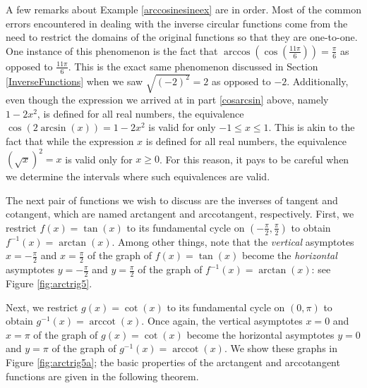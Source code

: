 \medskip

A few remarks about Example \ref{arccosinesineex} are in order.  Most of the common errors encountered in dealing with the inverse circular functions come from the need to restrict the domains of the original functions so that they are one-to-one.  One instance of this phenomenon is the fact that $\arccos\left( \cos\left(\frac{11\pi}{6}\right)\right) = \frac{\pi}{6}$ as opposed to $\frac{11\pi}{6}$. This is the exact same phenomenon discussed in Section \ref{InverseFunctions} when we saw  $\sqrt{(-2)^2} = 2$ as opposed to $-2$.    Additionally, even though the expression we arrived at in part \ref{cosarcsin} above, namely $1 - 2x^2$, is defined for all real numbers, the equivalence  $\cos\left(2 \arcsin(x)\right) = 1-2x^2$ is valid for only $-1 \leq x \leq 1$.  This is akin to the fact that while the expression $x$ is defined for all real numbers, the equivalence $\left( \sqrt{x} \right)^2 = x$ is valid only for $x \geq 0$.  For this reason, it pays to be careful when we determine the intervals where such equivalences are valid.



\bigskip

The next pair of functions we wish to discuss are the inverses of tangent and cotangent, which are named arctangent and arccotangent, respectively.  First, we restrict $f(x) = \tan(x)$ to its fundamental cycle on $\left(-\frac{\pi}{2}, \frac{\pi}{2}\right)$ to obtain $f^{-1}(x) = \arctan(x)$. Among other things, note that the \textit{vertical} asymptotes $x = -\frac{\pi}{2}$ and $x = \frac{\pi}{2}$ of the graph of $f(x) = \tan(x)$ become the \textit{horizontal} asymptotes $y = -\frac{\pi}{2}$ and $y = \frac{\pi}{2}$ of the graph of $f^{-1}(x) = \arctan(x)$: see Figure \ref{fig:arctrig5}.  



Next, we restrict $g(x) = \cot(x)$ to its fundamental cycle on $(0,\pi)$ to obtain $g^{-1}(x) = \operatorname{arccot}(x)$.  Once again, the vertical asymptotes $x=0$ and $x=\pi$ of the graph of $g(x) = \cot(x)$ become the horizontal asymptotes $y = 0$ and $y = \pi$ of the graph of $g^{-1}(x) = \operatorname{arccot}(x)$.  We show these graphs in Figure \ref{fig:arctrig5a}; 
the basic properties of the arctangent and arccotangent functions are given in the following theorem.


